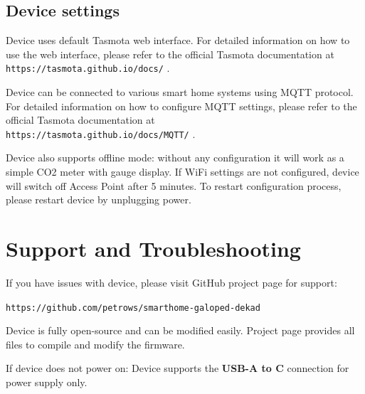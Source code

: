 \documentclass[11pt,a5paper]{article}
\begin{document}
\subsection{Device settings}

Device uses default Tasmota web interface. For detailed information on how to use
the web interface, please refer to the official Tasmota documentation at \texttt{https://tasmota.github.io/docs/} .

\medskip

Device can be connected to various smart home systems using MQTT protocol. For detailed information on how to
configure MQTT settings, please refer to the official Tasmota documentation at \\
\texttt{https://tasmota.github.io/docs/MQTT/} .

\medskip

Device also supports offline mode: without any configuration it will work as a simple CO2 meter with gauge display.
If WiFi settings are not configured, device will switch off Access Point after 5 minutes. To restart configuration
process, please restart device by unplugging power.

\section{Support and Troubleshooting}

If you have issues with device, please visit GitHub project page for support:

\medskip

\texttt{https://github.com/petrows/smarthome-galoped-dekad}

\medskip

Device is fully open-source and can be modified easily. Project page provides all
files to compile and modify the firmware.

\medskip

If device does not power on: Device supports the \textbf{USB-A to C} connection for power supply only.
\end{document}
